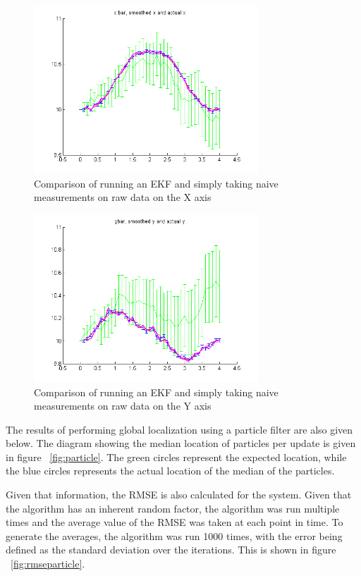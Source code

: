 \documentclass[english]{article}
\begin{document}
\begin{figure}[htp]
\centering
 \includegraphics[width=0.75\textwidth]{images/xxbar.png}
\caption{Comparison of running an EKF and simply taking naive measurements on raw data on the X axis}
\label{fig:xxbar}
\end{figure}

\begin{figure}[htp]
\centering
 \includegraphics[width=0.75\textwidth]{images/yybar.png}
\caption{Comparison of running an EKF and simply taking naive measurements on raw data on the Y axis}
\label{fig:yybar}
\end{figure}

The results of performing global localization using a particle filter are also given below. The diagram showing the median location of particles per update is given in figure ~\ref{fig:particle}. The green circles represent the expected location, while the blue circles represents the actual location of the median of the particles.

Given that information, the RMSE is also calculated for the system. Given that the algorithm has an inherent random factor, the algorithm was run multiple times and the average value of the RMSE was taken at each point in time. To generate the averages, the algorithm was run 1000 times, with the error being defined as the standard deviation over the iterations. This is shown in figure ~\ref{fig:rmseparticle}. 
\end{document}
